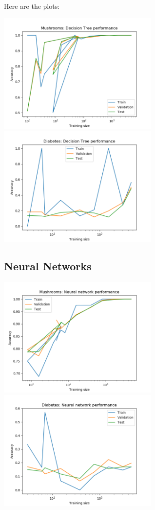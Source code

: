 \documentclass[11pt]{article}
\begin{document}
        Here are the plots:

        \includegraphics[width=8cm]{mushrooms/mushroom_dt_trainingsize.png}
        \includegraphics[width=8cm]{diabetes/diabetes_dt_trainingsize.png}

        \subsection{Neural Networks}

        \includegraphics[width=8cm]{mushrooms/mushroom_nn_trainingsize.png}
        \includegraphics[width=8cm]{diabetes/diabetes_nn_trainingsize.png}
\end{document}

